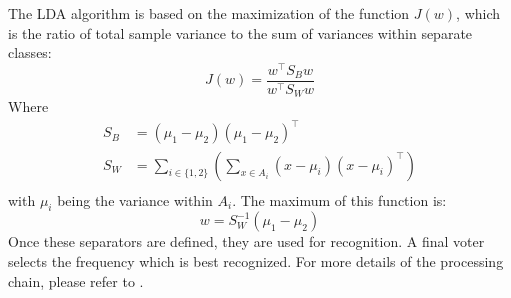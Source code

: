 \documentclass[smallextended]{svjour3}
\begin{document}
The LDA algorithm is based on the maximization of the function $J(w)$, which is the ratio of total sample variance to the sum of variances within separate classes: 
\[
J(w) = \frac{w^\top S_Bw}{w^\top S_Ww}
\]
Where 
\begin{align*}
S_B &= (\mu_1-\mu_2)(\mu_1-\mu_2)^\top\\
S_W &= \sum_{i \in \{1, 2\}}   ( \sum_{x\in A_i} (x-\mu_i)(x-\mu_i)^\top )\\
\end{align*}
with $\mu_i$ being the variance within $A_i$. The maximum of this function is:
\[
w = S_W^{-1}(\mu_1-\mu_2)
\]
Once these separators are defined, they are used for recognition. A final voter selects the frequency which is best recognized.
For more details of the processing chain, please refer to \cite{openvibeSSVEP}.
\end{document}
